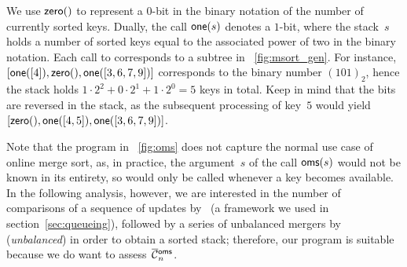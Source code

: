 We use \(\textsf{zero}()\) to represent a
\(0\)-bit in the binary notation of the number of currently sorted
keys. Dually, the call \(\textsf{one}(s)\) denotes
a \(1\)-bit, where the stack~\(s\) holds a number of sorted keys equal
to the associated power of two in the binary notation. Each call to
 corresponds to a subtree in
\fig~\vref{fig:msort_gen}. For instance, \([\textsf{one}([4]),
\textsf{zero}(), \textsf{one}([3,6,7,9])]\) corresponds to the binary number
\((101)_2\), hence the stack holds \(1 \cdot 2^2 + 0 \cdot 2^1 + 1
\cdot 2^0 = 5\) keys in total. Keep in mind that the bits are reversed
in the stack, as the subsequent processing of key~\(5\) would yield
\([\textsf{zero}(),\textsf{one}([4,5]),\textsf{one}([3,6,7,9])]\).

Note that the program in \fig~\vref{fig:oms} does not capture the
normal use case of online merge sort, as, in practice, the
argument~\(s\) of the call \(\textsf{oms}(s)\)
would not be known in its entirety, so
 would only be called whenever a key
becomes available. In the following analysis, however, we are
interested in the number of comparisons of a sequence of updates
by~ (a framework we used in
section~\ref{sec:queueing}), followed by a series of unbalanced
mergers by~ (\emph{unbalanced}) in
order to obtain a sorted stack; therefore, our program is suitable
because we do want to assess~\(\OC{\fun{oms}}{n}\).

